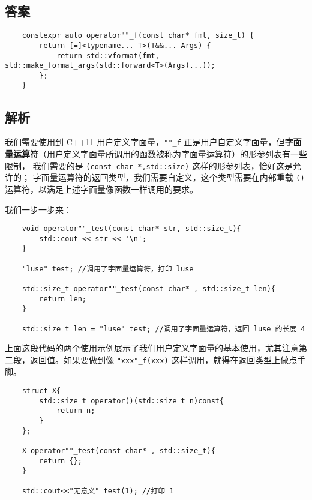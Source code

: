 

\subsection{答案}

\begin{verbatim}
    constexpr auto operator""_f(const char* fmt, size_t) {
        return [=]<typename... T>(T&&... Args) { 
            return std::vformat(fmt, std::make_format_args(std::forward<T>(Args)...));
        };
    }
\end{verbatim}

\subsection{解析}


我们需要使用到 C++11 用户定义字面量，\texttt{""_f} 正是用户自定义字面量，但\textbf{字面量运算符}（用户定义字面量所调用的函数被称为字面量运算符）的形参列表有一些限制，
我们需要的是 \texttt{(const char *,std::size)} 这样的形参列表，恰好这是允许的；
字面量运算符的返回类型，我们需要自定义，这个类型需要在内部重载 \texttt{()} 运算符，以满足上述字面量像函数一样调用的要求。

我们一步一步来：

\begin{verbatim}
    void operator""_test(const char* str, std::size_t){
        std::cout << str << '\n';
    }
    
    "luse"_test; //调用了字面量运算符，打印 luse
    
    std::size_t operator""_test(const char* , std::size_t len){
        return len;
    }
    
    std::size_t len = "luse"_test; //调用了字面量运算符，返回 luse 的长度 4
\end{verbatim}

上面这段代码的两个使用示例展示了我们用户定义字面量的基本使用，尤其注意第二段，返回值。如果要做到像 \texttt{"xxx"_f(xxx)} 这样调用，就得在返回类型上做点手脚。

\begin{verbatim}
    struct X{
        std::size_t operator()(std::size_t n)const{
            return n;
        }
    };
    
    X operator""_test(const char* , std::size_t){
        return {};
    }
    
    std::cout<<"无意义"_test(1); //打印 1
\end{verbatim}

